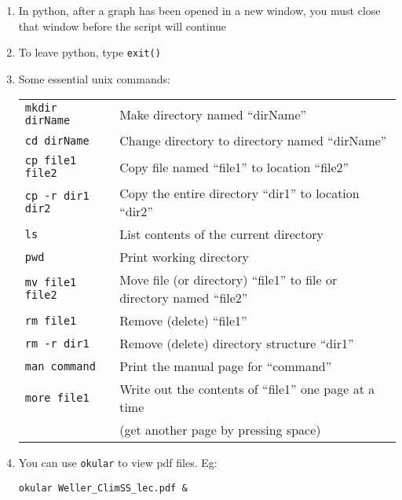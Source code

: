 \begin{enumerate}
{\tt execfile("linearAdvect\_HW.py")}

\item In python, after a graph has been opened in a new window, you must close that window before the script will continue

\item To leave python, type {\tt exit()}

\item Some essential unix commands:

\begin{tabular}{ll}
{\tt mkdir dirName} & Make directory named ``dirName'' \\
{\tt cd dirName} & Change directory to directory named ``dirName''\\
{\tt cp file1 file2} & Copy file named ``file1'' to location ``file2''\\
{\tt cp -r dir1 dir2} & Copy the entire directory ``dir1'' to location ``dir2''\\
{\tt ls} & List contents of the current directory \\
{\tt pwd} & Print working directory \\
{\tt mv file1 file2} & Move file (or directory) ``file1'' to file or directory named ``file2'' \\
{\tt rm file1} & Remove (delete) ``file1'' \\
{\tt rm -r dir1} & Remove (delete) directory structure ``dir1'' \\
{\tt man command} & Print the manual page for ``command''\\
{\tt more file1} & Write out the contents of ``file1'' one page at a time\\
& (get another page by pressing space) \\
\end{tabular}

\item You can use {\tt okular} to view pdf files. Eg:

{\tt okular Weller\_ClimSS\_lec.pdf \&}

\end{enumerate}


